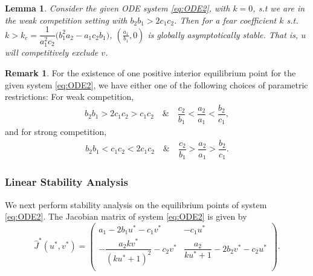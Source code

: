 \documentclass[10pt]{amsart}
\newtheorem{lemma}[theorem]{Lemma}
\theoremstyle{definition}
\newtheorem{remark}{Remark}
\begin{document}
\begin{lemma}
\label{lem:cotce}
Consider the given ODE system \eqref{eq:ODE2}, with $k=0$, s.t we are in the weak competition setting with $b_2b_1>2c_1c_2$.
Then for a fear coefficient $k$ s.t. $k > k_{c} = \dfrac{1}{a_1^2c_2} \Big( b_1^2a_2-a_1c_2b_1\Big)$, $(\frac{a_1}{b_1},0)$ is globally asymptotically stable. That is, $u$ will competitively exclude $v$.
\end{lemma}



\begin{remark}
	For the existence of one positive interior equilibrium point for the given system \eqref{eq:ODE2}, we have either one of the following choices of parametric restrictions: For weak competition, 
	\begin{align}\label{one_post_weak}
		b_2b_1>2c_1c_2>c_1c_2 \quad \& \quad \dfrac{c_2}{b_1}<\dfrac{a_2}{a_1} <\dfrac{b_2}{c_1},
	\end{align}
	and for strong competition,
	\begin{align}\label{one_post_strong}
		b_2b_1<c_1c_2<2c_1c_2 \quad \& \quad \dfrac{c_2}{b_1}>\dfrac{a_2}{a_1} >\dfrac{b_2}{c_1}.
	\end{align}
	
\end{remark}

\subsubsection{Linear Stability Analysis}

We next perform stability analysis on the equilibrium points of system \eqref{eq:ODE2}. The Jacobian matrix of system \eqref{eq:ODE2} is given by
\begin{equation}\label{jacob_second}
	\widehat{J}^*(u^*,v^*)=
	\left(
	\begin{array}{cc}
		a_1-2b_1u^*-c_1v^* & -c_1 u^* \\
		-\dfrac{a_2 k v^*}{(k u^*+1)^2}-c_2 v^* & \dfrac{a_2}{k u^*+1}-2 b_2 v^*-c_2 u^* \\
	\end{array}
	\right).
\end{equation}
\end{document}
